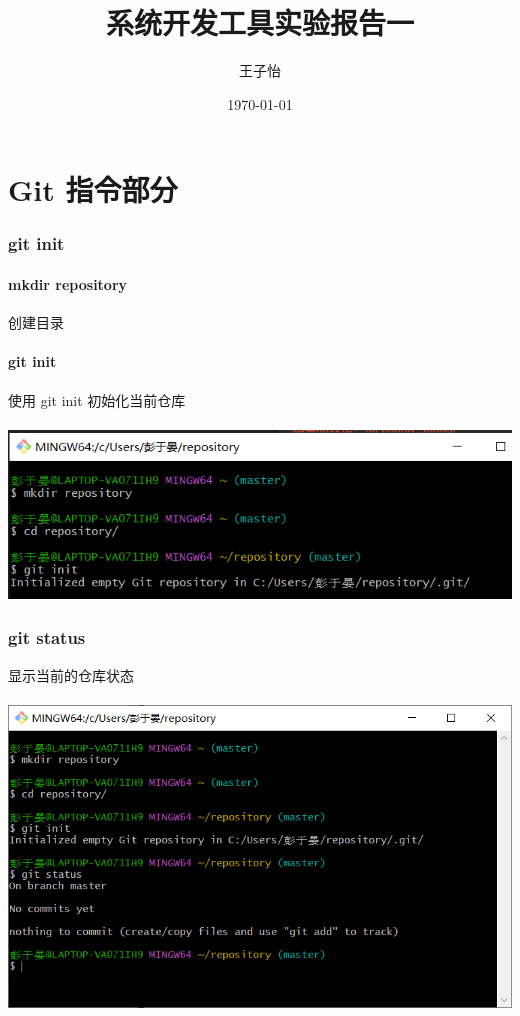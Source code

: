 \documentclass[a4paper, 12pt]{article}
\begin{document}
\title{系统开发工具实验报告一}
\author{王子怡}
\date{\today}
\maketitle

\tableofcontents
\newpage 

\part{Git 指令部分}

\section{git init}
\subsection{mkdir repository}
\label{sec1} 
创建目录
\subsection{git init}
使用 git init 初始化当前仓库\\ \\
\includegraphics[width=1\linewidth]{1.png}

\section{git status}
显示当前的仓库状态\\ \\
\includegraphics[width=1\linewidth]{2.png}  
\end{document}
